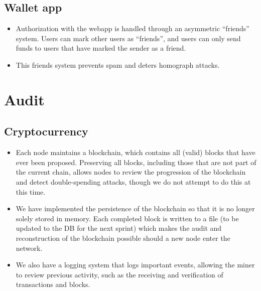 \documentclass[a4paper,12pt]{article}
\begin{document}
\subsection{Wallet app}

\begin{itemize}
\item Authorization with the webapp is handled through an asymmetric ``friends'' system. Users can mark other users as ``friends'', and users can only send funds to users that have marked the sender as a friend.
\item This friends system prevents spam and deters homograph attacks.
\end{itemize}

\section{Audit}

\subsection{Cryptocurrency}

\begin{itemize}
\item Each node maintains a blockchain, which contains all (valid) blocks that have ever been proposed. Preserving all blocks, including those that are not part of the current chain, allows nodes to review the progression of the blockchain and detect double-spending attacks, though we do not attempt to do this at this time.
\begin{comment}
\item Miners heavily audit the work of other miners in order to maintain the integrity of the blockchain.
\item For each block a miner receives (or broadcasts), its hash will be checked to see if it satisfies a set difficulty.
\item Every transaction inside of the block is verified by checking that each input has a corresponding unspent output (UTXO), that the signature for each input was signed with the private key corresponding to the public key on the previous UTXO, and that the sum of the input amounts (from the UTXO's) is equal to the sum of the outputs.
\item If either of these checks fail, the potential new block will be rejected.
\item So long as an adversary does not control a majority of nodes in the network, blocks will not be added to the blockchain that are not correct.
\end{comment}
\item We have implemented the persistence of the blockchain so that it is no longer solely stored in memory.
Each completed block is written to a file (to be updated to the DB for the next sprint) which makes the audit and reconstruction of the blockchain possible should a new node enter the network.
\item We also have a logging system that logs important events, allowing the miner to review previous activity, such as the receiving and verification of transactions and blocks.
\end{itemize}
\end{document}
